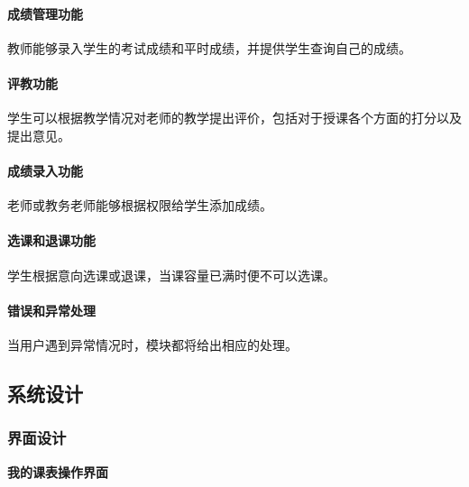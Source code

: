 \documentclass{article}
\begin{document}
\paragraph{成绩管理功能}
教师能够录入学生的考试成绩和平时成绩，并提供学生查询自己的成绩。

\paragraph{评教功能}
学生可以根据教学情况对老师的教学提出评价，包括对于授课各个方面的打分以及提出意见。

\paragraph{成绩录入功能}
老师或教务老师能够根据权限给学生添加成绩。

\paragraph{选课和退课功能}
学生根据意向选课或退课，当课容量已满时便不可以选课。

\paragraph{错误和异常处理}
当用户遇到异常情况时，模块都将给出相应的处理。

\subsection{系统设计}
\subsubsection{界面设计}

\begin{center}
\textbf{我的课表操作界面}
\end{center}
\end{document}
